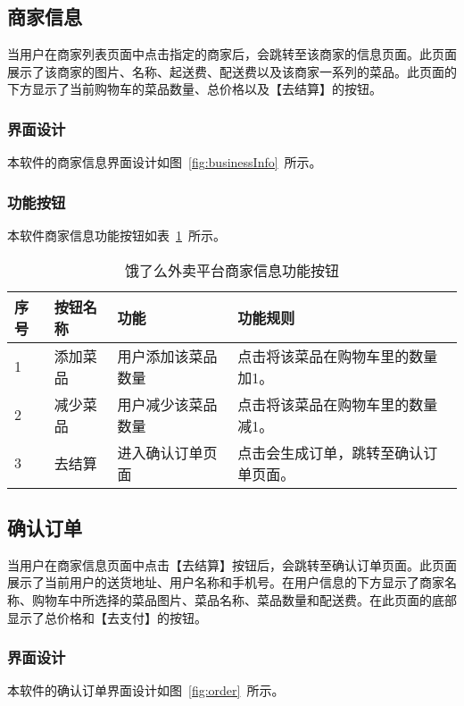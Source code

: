 \subsection{商家信息}
当用户在商家列表页面中点击指定的商家后，会跳转至该商家的信息页面。此页面展示了该商家的图片、名称、起送费、配送费以及该商家一系列的菜品。此页面的下方显示了当前购物车的菜品数量、总价格以及【去结算】的按钮。
\subsubsection{界面设计}
本软件的商家信息界面设计如图~\ref{fig:businessInfo}~所示。
\subsubsection{功能按钮}
本软件商家信息功能按钮如表~\ref{tab:table4}~所示。
\begin{table}[htbp]
    \caption{饿了么外卖平台商家信息功能按钮}\label{tab:table4}
    \vspace{0.5em}\wuhao
    \begin{tabularx}{\textwidth}{lllX}
    \toprule[1.5pt]
    序号 & 按钮名称 & 功能 & 功能规则 \\ 
    \midrule[1pt]
    1 & 添加菜品 & 用户添加该菜品数量 & 点击将该菜品在购物车里的数量加1。 \\
    2 & 减少菜品 & 用户减少该菜品数量 & 点击将该菜品在购物车里的数量减1。 \\
    3 & 去结算 & 进入确认订单页面 & 点击会生成订单，跳转至确认订单页面。 \\
\bottomrule[1.5pt]
\end{tabularx}
\vspace{\baselineskip}
\end{table}

\subsection{确认订单}
当用户在商家信息页面中点击【去结算】按钮后，会跳转至确认订单页面。此页面展示了当前用户的送货地址、用户名称和手机号。在用户信息的下方显示了商家名称、购物车中所选择的菜品图片、菜品名称、菜品数量和配送费。在此页面的底部显示了总价格和【去支付】的按钮。
\subsubsection{界面设计}
本软件的确认订单界面设计如图~\ref{fig:order}~所示。
